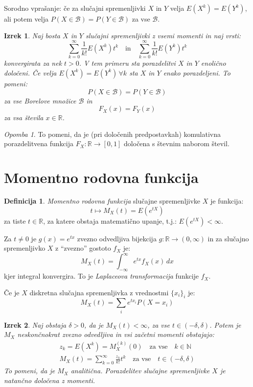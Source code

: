 \documentclass[12pt]{book}
\def\n{\noindent}
\theoremstyle{definition}
\newtheorem{definicija}{Definicija}
\theoremstyle{plain}
\newtheorem{izrek}{Izrek}
\theoremstyle{plain}
\theoremstyle{plain}
\theoremstyle{plain}
\theoremstyle{remark}
\newtheorem*{opomba}{Opomba}
\begin{document}
\n Sorodno vprašanje: če za slučajni spremenljivki $X$ in $Y$ velja $E\left(X^k\right)=E\left(Y^k\right)$, ali potem velja $P(X \in \mathcal{B})=P(Y \in \mathcal{B})$ za vse $\mathcal{B}$.

\begin{izrek}
    Naj bosta $X$ in $Y$ slučajni spremenljivki z vsemi momenti in naj vrsti:
    $$
    \sum_{k=0}^{\infty} \frac{1}{k!} E\left(X^k\right) t^k \quad \text{in} \quad \sum_{k=0}^{\infty} \frac{1}{k!} E\left(Y^k\right) t^k
    $$ 
    konvergirata za nek $t>0$. V tem primeru sta porazdelitvi $X$ in $Y$ enolično določeni. Če velja $E\left(X^k\right)=E\left(Y^k\right) \, \forall k$ sta $X$ in $Y$ enako porazdeljeni. To pomeni: 
    $$
    P(X \in \mathcal{B})=P(Y \in \mathcal{B})
    $$ 
    za vse Borelove množice $\mathcal{B}$ in 
    $$
    F_X(x)=F_Y(x)
    $$
    za vsa števila $x \in \mathbb{R}$. 
\end{izrek}

\begin{opomba}
    To pomeni, da je (pri določenih predpostavkah) komulativna porazdelitvena funkcija $F_X: \mathbb{R} \to [0,1]$ določena s števnim naborom števil. 
\end{opomba}

\section{Momentno rodovna funkcija}

\begin{definicija}
    \emph{Momentno rodovna funkcija} slučajne spremenljivke $X$ je funkcija: 
    $$
    t \mapsto M_X(t)=E\left(e^{t  X}\right)
    $$
    za tiste $t \in \mathbb{R}$, za katere obstaja matematično upanje, t.j.: $E\left(e^{t X}\right)<\infty$. 
\end{definicija}

\n Za $t \neq 0$ je $g(x) = e^{tx}$ zvezno odvedljiva bijekcija $g:\mathbb{R} \to (0, \infty)$ in za slučajno spremenljivko $X$ z “zvezno” gostoto $f_X$ je: 
$$
M_X(t)=\int_{-\infty}^{\infty} e^{t x} f_X(x) \, d x
$$
kjer integral konvergira. To je \emph{Laplaceova transformacija} funkcije $f_X$.

\n Če je $X$ diskretna slučajna spremenljivka z vrednostmi $\{x_i\}_{i}$ je: 
$$
M_X(t)=\sum_i e^{t x_i} P\left(X=x_i\right)
$$

\begin{izrek}
    Naj obstaja $\delta > 0$, da je $M_X(t)<\infty$, za vse $t \in(-\delta, \delta)$. Potem je $M_X$ neskončnokrat zvezno odvedljiva in vsi začetni momenti obstajajo: 
    $$
    \begin{aligned}
        & z_k=E\left(X^k\right)=M_X^{(k)}(0) \quad \text {za vse} \quad  k \in \mathbb{N} & \\
        & M_X(t)=\sum_{k=0}^{\infty} \frac{z_k}{k !} t^k \quad \text{za vse} \quad {t \in(-\delta, \delta)} &
    \end{aligned}
    $$
    To pomeni, da je $M_X$ analitična. Porazdelitev slučajne spremenljivke $X$ je natančno določena z momenti. 
\end{izrek}
\end{document}
